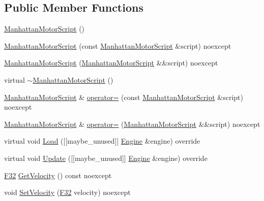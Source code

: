 \subsection*{Public Member Functions}
\begin{DoxyCompactItemize}
\item 
\mbox{\hyperlink{classmage_1_1script_1_1_manhattan_motor_script_a042ae1a4a53d27c75ff85d5728ac3289}{Manhattan\+Motor\+Script}} ()
\item 
\mbox{\hyperlink{classmage_1_1script_1_1_manhattan_motor_script_a5c3bc9b400243333b661e4fd0e6e74b6}{Manhattan\+Motor\+Script}} (const \mbox{\hyperlink{classmage_1_1script_1_1_manhattan_motor_script}{Manhattan\+Motor\+Script}} \&script) noexcept
\item 
\mbox{\hyperlink{classmage_1_1script_1_1_manhattan_motor_script_a62843ba8d660b496bec036082a0867f6}{Manhattan\+Motor\+Script}} (\mbox{\hyperlink{classmage_1_1script_1_1_manhattan_motor_script}{Manhattan\+Motor\+Script}} \&\&script) noexcept
\item 
virtual \mbox{\hyperlink{classmage_1_1script_1_1_manhattan_motor_script_aca76d9d5be76b048ec247e93e4a89adb}{$\sim$\+Manhattan\+Motor\+Script}} ()
\item 
\mbox{\hyperlink{classmage_1_1script_1_1_manhattan_motor_script}{Manhattan\+Motor\+Script}} \& \mbox{\hyperlink{classmage_1_1script_1_1_manhattan_motor_script_a1c4dc4ffae903942248c7f744b0d019f}{operator=}} (const \mbox{\hyperlink{classmage_1_1script_1_1_manhattan_motor_script}{Manhattan\+Motor\+Script}} \&script) noexcept
\item 
\mbox{\hyperlink{classmage_1_1script_1_1_manhattan_motor_script}{Manhattan\+Motor\+Script}} \& \mbox{\hyperlink{classmage_1_1script_1_1_manhattan_motor_script_a3184ea5b921fbdbd81173db3f7042a0c}{operator=}} (\mbox{\hyperlink{classmage_1_1script_1_1_manhattan_motor_script}{Manhattan\+Motor\+Script}} \&\&script) noexcept
\item 
virtual void \mbox{\hyperlink{classmage_1_1script_1_1_manhattan_motor_script_ac93b09e8f82932f7071b1f591a8004e9}{Load}} (\mbox{[}\mbox{[}maybe\+\_\+unused\mbox{]}\mbox{]} \mbox{\hyperlink{classmage_1_1_engine}{Engine}} \&engine) override
\item 
virtual void \mbox{\hyperlink{classmage_1_1script_1_1_manhattan_motor_script_af1ee420e1378bf930cce1ce92a37d640}{Update}} (\mbox{[}\mbox{[}maybe\+\_\+unused\mbox{]}\mbox{]} \mbox{\hyperlink{classmage_1_1_engine}{Engine}} \&engine) override
\item 
\mbox{\hyperlink{namespacemage_aa97e833b45f06d60a0a9c4fc22ae02c0}{F32}} \mbox{\hyperlink{classmage_1_1script_1_1_manhattan_motor_script_a2f73545bf2fb507375251d530054ac9b}{Get\+Velocity}} () const noexcept
\item 
void \mbox{\hyperlink{classmage_1_1script_1_1_manhattan_motor_script_acf4db52ae6b0c9f97c0b7e719acea6bc}{Set\+Velocity}} (\mbox{\hyperlink{namespacemage_aa97e833b45f06d60a0a9c4fc22ae02c0}{F32}} velocity) noexcept
\end{DoxyCompactItemize}
